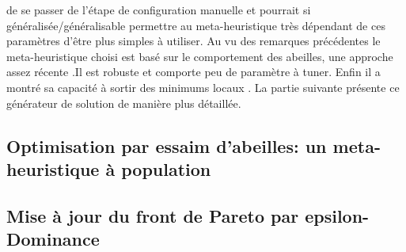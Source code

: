 de se passer de l’étape de configuration manuelle et pourrait si généralisée/généralisable
permettre au meta-heuristique très dépendant de ces paramètres d’être plus simples
à utiliser.
Au vu des remarques précédentes le meta-heuristique choisi est basé sur le
comportement des abeilles, une approche assez récente .Il est
robuste  et comporte peu de paramètre à tuner. Enfin il
a montré sa capacité à sortir des minimums locaux .
La partie suivante présente ce générateur de solution de manière plus détaillée.


\subsection{Optimisation par essaim d’abeilles: un meta-heuristique à population} %
\label{sub:optimisation_par_essaim_d_abeilles_un_meta_heuristique_a_population}

\subsection{Mise à jour du front de Pareto par epsilon-Dominance} %
\label{sub:mise_a_jour_du_front_de_pareto_par_epsilon_dominance}


